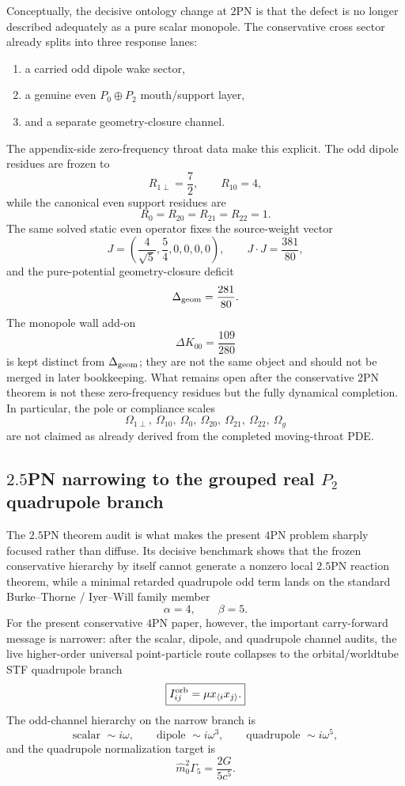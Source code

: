 \documentclass[11pt]{article}
\begin{document}
Conceptually, the decisive ontology change at $2$PN is that the defect is no
 longer described adequately as a pure scalar monopole.  The conservative cross
 sector already splits into three response lanes:
\begin{enumerate}
  \item a carried odd dipole wake sector,
  \item a genuine even $P_0\oplus P_2$ mouth/support layer,
  \item and a separate geometry-closure channel.
\end{enumerate}
The appendix-side zero-frequency throat data make this explicit.  The odd dipole
 residues are frozen to
\[
R_{1\perp}=\frac72,
\qquad
R_{10}=4,
\]
while the canonical even support residues are
\[
R_0=R_{20}=R_{21}=R_{22}=1.
\]
The same solved static even operator fixes the source-weight vector
\[
J=\left(\frac{4}{\sqrt5},\frac54,0,0,0,0\right),
\qquad
J\cdot J=\frac{381}{80},
\]
and the pure-potential geometry-closure deficit
\[
\Delta_{\rm geom}=\frac{281}{80}.
\]
The monopole wall add-on
\[
\Delta K_{00}=\frac{109}{280}
\]
is kept distinct from $\Delta_{\rm geom}$; they are not the same object and
 should not be merged in later bookkeeping.  What remains open after the
 conservative $2$PN theorem is not these zero-frequency residues but the fully
 dynamical completion.  In particular, the pole or compliance scales
\[
\Omega_{1\perp},\ \Omega_{10},\ \Omega_0,
\ \Omega_{20},\ \Omega_{21},\ \Omega_{22},\ \Omega_g
\]
are not claimed as already derived from the completed moving-throat PDE.

\subsection{\texorpdfstring{$2.5$}{2.5}PN narrowing to the grouped real \texorpdfstring{$P_2$}{P2} quadrupole branch}
\label{app:carry-forward-25pn}

The $2.5$PN theorem audit is what makes the present $4$PN problem sharply
 focused rather than diffuse.  Its decisive benchmark shows that the frozen
 conservative hierarchy by itself cannot generate a nonzero local $2.5$PN
 reaction theorem, while a minimal retarded quadrupole odd term lands on the
 standard Burke--Thorne / Iyer--Will family member
\[
\alpha=4,
\qquad
\beta=5.
\]
For the present conservative $4$PN paper, however, the important carry-forward
 message is narrower: after the scalar, dipole, and quadrupole channel audits,
 the live higher-order universal point-particle route collapses to the
 orbital/worldtube STF quadrupole branch
\[
\boxed{I_{ij}^{\rm orb}=\mu x_{\langle i}x_{j\rangle}.}
\]
The odd-channel hierarchy on the narrow branch is
\[
\text{scalar }\sim i\omega,
\qquad
\text{dipole }\sim i\omega^3,
\qquad
\text{quadrupole }\sim i\omega^5,
\]
and the quadrupole normalization target is
\[
\boxed{\hat m_0^2\Gamma_5=\frac{2G}{5c^5}.}
\]
\end{document}
